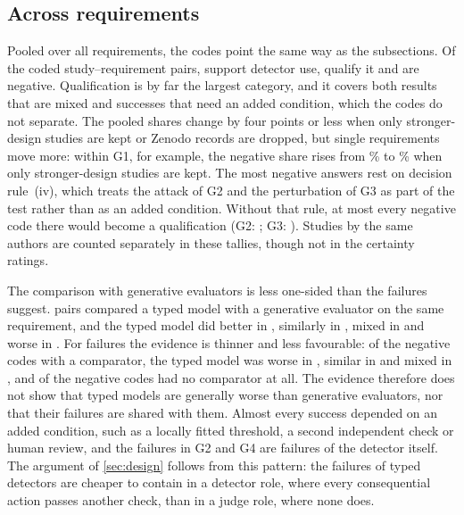 \subsection{Across requirements}
\label{sec:across}

Pooled over all requirements, the codes point the same way as the subsections.
Of the \nRowsAll{} coded study--requirement pairs, \nSAll{} support detector use, \nQAll{} qualify it and \nNAll{} are negative.
Qualification is by far the largest category, and it covers both results that are mixed and successes that need an added condition, which the codes do not separate.
The pooled shares change by four points or less when only stronger-design studies are kept or Zenodo records are dropped, but single requirements move more: within G1, for example, the negative share rises from \nGOneNegShare{}\% to \nGOneNegShareStrong{}\% when only stronger-design studies are kept.
The most negative answers rest on decision rule~(iv), which treats the attack of G2 and the perturbation of G3 as part of the test rather than as an added condition. Without that rule, at most every negative code there would become a qualification (G2: \nGTwoNoRuleFour{}; G3: \nGThreeNoRuleFour{}).
Studies by the same authors are counted separately in these tallies, though not in the certainty ratings.

The comparison with generative evaluators is less one-sided than the failures suggest.
\nComparedAll{} pairs compared a typed model with a generative evaluator on the same requirement, and the typed model did better in \nCompBetter{}, similarly in \nCompSimilar{}, mixed in \nCompMixed{} and worse in \nCompWorse{}.
For failures the evidence is thinner and less favourable: of the \nNegComp{} negative codes with a comparator, the typed model was worse in \nNegCompWorse{}, similar in \nNegCompSimilar{} and mixed in \nNegCompMixed{}, and \nNegNoComp{} of the \nNegAll{} negative codes had no comparator at all.
The evidence therefore does not show that typed models are generally worse than generative evaluators, nor that their failures are shared with them.
Almost every success depended on an added condition, such as a locally fitted threshold, a second independent check or human review, and the failures in G2 and G4 are failures of the detector itself.
The argument of \cref{sec:design} follows from this pattern: the failures of typed detectors are cheaper to contain in a detector role, where every consequential action passes another check, than in a judge role, where none does.

